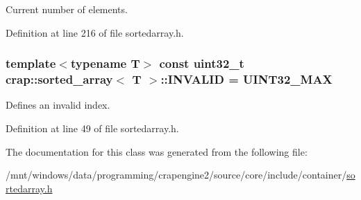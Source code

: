 Current number of elements. 



Definition at line 216 of file sortedarray.\+h.

\hypertarget{classcrap_1_1sorted__array_aa250f06b74b940be0c7e37e775e6765b}{
\subsubsection[{I\+N\+V\+A\+L\+I\+D}]{\setlength{\rightskip}{0pt plus 5cm}template$<$typename T$>$ const uint32\+\_\+t {\bf crap\+::sorted\+\_\+array}$<$ T $>$\+::I\+N\+V\+A\+L\+I\+D = {\bf U\+I\+N\+T32\+\_\+\+M\+A\+X}\hspace{0.3cm}{\ttfamily [static]}}}\label{classcrap_1_1sorted__array_aa250f06b74b940be0c7e37e775e6765b}


Defines an invalid index. 



Definition at line 49 of file sortedarray.\+h.



The documentation for this class was generated from the following file\+:\begin{DoxyCompactItemize}
\item 
/mnt/windows/data/programming/crapengine2/source/core/include/container/\hyperlink{sortedarray_8h}{sortedarray.\+h}\end{DoxyCompactItemize}
